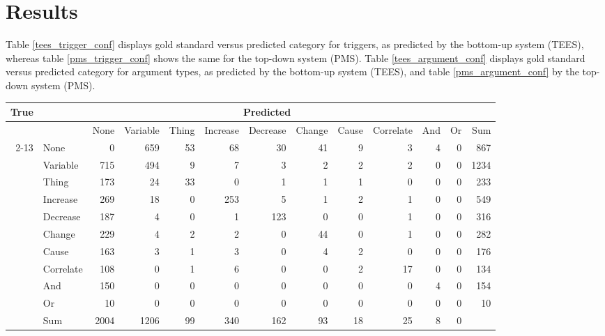 \section{Results}

Table \ref{tees_trigger_conf} displays gold standard versus predicted category for triggers, as predicted by the bottom-up system (TEES), whereas table \ref{pms_trigger_conf} shows the same for the top-down system (PMS). Table \ref{tees_argument_conf} displays gold standard versus predicted category for argument types, as predicted by the bottom-up system (TEES), and table \ref{pms_argument_conf} by the top-down system (PMS).

\begin{sidewaystable}
\begin{center}
\begin{tabular}{ | r | l | r | r | r | r | r | r | r | r | r | r | r |}
	\hline
	\multirow{11}{*}{True} & \multicolumn{12}{c|}{Predicted} \\ \hline
	&\cellcolor{gray} & None & Variable & Thing & Increase & Decrease & Change & Cause & Correlate & And & Or & Sum\\ \cline{2-13}
	&None & \cellcolor{g} 0 & 659 & 53 & 68 & 30 & 41 & 9 & 3 & 4 & 0 & 867 \\
	&Variable & 715 & \cellcolor{g} 494 & 9 & 7 & 3 & 2 & 2 & 2 & 0 & 0 & 1234 \\
	&Thing & 173 & 24 & \cellcolor{g} 33 & 0 & 1 & 1 & 1 & 0 & 0 & 0 & 233 \\
	&Increase & 269 & 18 & 0 & \cellcolor{g} 253 & 5 & 1 & 2 & 1 & 0 & 0 & 549 \\
	&Decrease & 187 & 4 & 0 & 1 & \cellcolor{g} 123 & 0 & 0 & 1 & 0 & 0 & 316 \\
	&Change & 229 & 4 & 2 & 2 & 0 & \cellcolor{g} 44 & 0 & 1 & 0 & 0 & 282 \\
	&Cause & 163 & 3 & 1 & 3 & 0 & 4 & \cellcolor{g} 2 & 0 & 0 & 0 & 176 \\
	&Correlate & 108 & 0 & 1 & 6 & 0 & 0 & 2 & \cellcolor{g} 17 & 0 & 0 & 134 \\ 
	&And & 150 & 0 & 0 & 0 & 0 & 0 & 0 & 0 & \cellcolor{g} 4 & 0 & 154\\ 
	&Or & 10 & 0 & 0 & 0 & 0 & 0 & 0 & 0 & 0 & \cellcolor{g} 0 & 10 \\ \hline
	&Sum& 2004 & 1206 & 99 & 340 & 162 & 93 & 18 & 25 & 8 & 0 & \\ \hline
\end{tabular}
\end{center}
\caption{Confusion matrix for trigger categories, bottom-up system.}
\label{tees_trigger_conf}
\end{sidewaystable}

